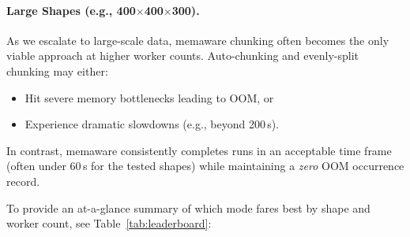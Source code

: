 \paragraph{Large Shapes (e.g., 400\(\times\)400\(\times\)300).}
As we escalate to large-scale data, memaware chunking often becomes the only viable approach at higher worker counts.
Auto-chunking and evenly-split chunking may either:
\begin{itemize}
    \item Hit severe memory bottlenecks leading to \ac{OOM}, or
    \item Experience dramatic slowdowns (e.g., beyond 200\,s).
\end{itemize}
In contrast, memaware consistently completes runs in an acceptable time frame (often under 60\,s for the tested shapes) while maintaining a \emph{zero} \ac{OOM} occurrence record.

To provide an at-a-glance summary of which mode fares best by shape and worker count, see Table~\ref{tab:leaderboard}:

